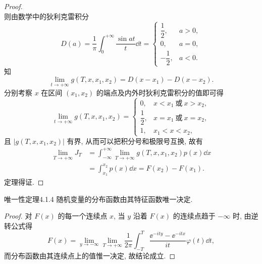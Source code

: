 \begin{proof}
\begin{equation*}
    \end{equation*}
    则由数学中的狄利克雷积分
    \begin{equation*}
        D (a) = \frac{1}{\pi} \int_0^{+\infty} \frac{\sin at}{t} \dd t =
        \begin{cases}
            \dfrac{1}{2}, & a > 0,\\
            0, & a = 0,\\
            -\dfrac{1}{2}, & a < 0.
        \end{cases}
    \end{equation*}
    知
    \begin{equation*}
        \lim_{t \to +\infty} g (T, x, x_1, x_2) = D (x - x_1) - D (x - x_2).
    \end{equation*}
    分别考察 $ x $ 在区间 $ (x_1, x_2) $ 的端点及内外时狄利克雷积分的值即可得
    \begin{equation*}
        \lim_{t \to +\infty} g (T, x, x_1, x_2) =
        \begin{cases}
            0, & x < x_1 \ \text{或} \ x > x_2,\\
            \dfrac{1}{2}, & x = x_1 \ \text{或} \ x = x_2,\\
            1, & x_1 < x < x_2,
        \end{cases}
    \end{equation*}
    且 $ \lvert g (T, x, x_1, x_2) \rvert $ 有界, 从而可以把积分号和极限号互换, 故有
    \begin{align*}
        \lim_{T \to +\infty} J_T & = \int_{-\infty}^{+\infty} \lim_{T \to +\infty} g (T, x, x_1, x_2) p (x) \dd x\\
        & = \int_{x_1}^{x_2} p (x) \dd x = F (x_2) - F (x_1).
    \end{align*}
    定理得证.
\end{proof}

\begin{theorem}{唯一性定理}{4.1.4}
    随机变量的分布函数由其特征函数唯一决定.
\end{theorem}

\begin{proof}
    对 $ F (x) $ 的每一个连续点 $ x $, 当 $ y $ 沿着 $ F (x) $ 的连续点趋于 $ -\infty $ 时, 由逆转公式得
    \begin{equation*}
        F (x) = \lim_{y \to -\infty} \lim_{T \to +\infty} \frac{1}{2\pi} \int_{-T}^T \frac{\ee^{-ity} - \ee^{-itx}}{it} \varphi (t) \dd t,
    \end{equation*}
    而分布函数由其连续点上的值惟一决定, 故结论成立.
\end{proof}

